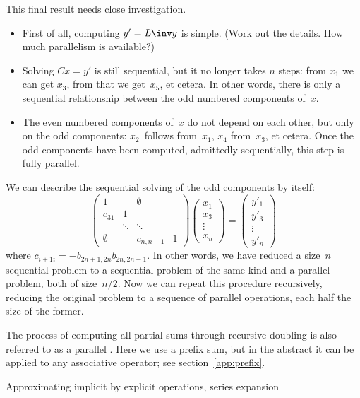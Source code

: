 This final result needs close investigation.
\begin{itemize}
\item First of all, computing $y'=L\inv y$ is simple. (Work out the
  details. How much parallelism is available?)
\item Solving $Cx=y'$ is still sequential, but it no longer takes $n$
  steps: from $x_1$ we can get $x_3$, from that we get~$x_5$, et
  cetera. In other words, there is only a sequential relationship
  between the odd numbered components of~$x$.
\item The even numbered components of~$x$ do not depend on each other,
  but only on the odd components: $x_2$~follows from~$x_1$, $x_4$
  from~$x_3$, et cetera. Once the odd components have been computed,
  admittedly sequentially, this step is fully parallel.
\end{itemize}
We can describe the sequential solving of the odd components by
itself:
\[ 
  \begin{pmatrix}
    1&&\emptyset\\ c_{31}&1\\ &\ddots&\ddots\\ 
    \emptyset&&c_{n,n-1}&1
  \end{pmatrix}
  \begin{pmatrix}
    x_1\\ x_3\\ \vdots\\ x_n
  \end{pmatrix} = 
  \begin{pmatrix}
    y'_1\\ y'_3\\ \vdots\\ y'_n
  \end{pmatrix}
\]
where $c_{i+1i}=-b_{2n+1,2n}b_{2n,2n-1}$. In other words, we have
reduced a size~$n$ sequential problem to a sequential problem of the
same kind and a parallel problem, both of size~$n/2$. Now we can
repeat this procedure recursively, reducing the original problem to a
sequence of parallel operations, each half the size of the former.

The process of computing all partial sums through recursive doubling
is also referred to as a parallel 
.
Here we use a prefix sum, but in the abstract it
can be applied to any associative operator;
see section~\ref{app:prefix}.


 {Approximating implicit by explicit operations, series expansion}
\label{sec:implicit-becomes-explicit}

